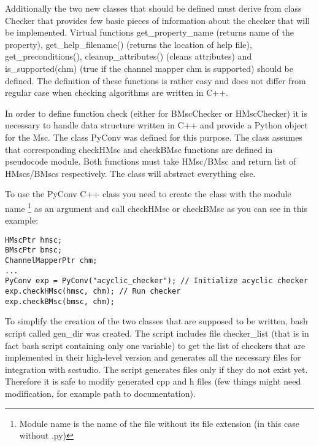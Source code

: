 \documentclass[11pt,oneside]{fithesis2}
\begin{document}
Additionally the two new classes that should be defined must derive from class Checker that provides few basic pieces of information about the checker that will be implemented. Virtual functions get\_property\_name (returns name of the property), get\_help\_filename() (returns the location of help file), get\_preconditions(), cleanup\_attributes() (cleans attributes) and is\_supported(chm) (true if the channel mapper chm is supported) should be defined. The definition of these functions is rather easy and does not differ from regular case when checking algorithms are written in C++.

In order to define function check (either for BMscChecker or HMscChecker) it is necessary to handle data structure written in C++ and provide a Python object for the Msc. The class PyConv was defined for this purpose. The class assumes that corresponding checkHMsc and checkBMsc functions are defined in pseudocode module. Both functions must take HMsc/BMsc and return list of HMscs/BMscs respectively. The class will abstract everything else.

To use the PyConv C++ class you need to create the class with the module name \footnote{Module name is the name of the file without its file extension (in this case without .py)} as an argument and call checkHMsc or checkBMsc as you can see in this example:
\begin{lstlisting}
HMscPtr hmsc;
BMscPtr bmsc;
ChannelMapperPtr chm;
...
PyConv exp = PyConv("acyclic_checker"); // Initialize acyclic checker
exp.checkHMsc(hmsc, chm); // Run checker
exp.checkBMsc(bmsc, chm);
\end{lstlisting}

To simplify the creation of the two classes that are supposed to be written, bash script called gen\_dir was created. The script includes file checker\_list (that is in fact bash script containing only one variable) to get the list of checkers that are implemented in their high-level version and generates all the necessary files for integration with scstudio. The script generates files only if they do not exist yet. Therefore it is safe to modify generated cpp and h files (few things might need modification, for example path to documentation).
\end{document}
